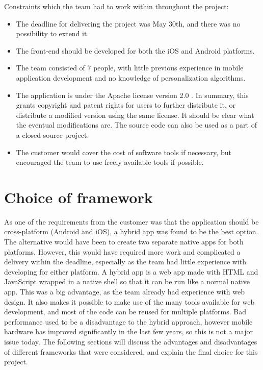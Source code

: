 Constraints which the team had to work within throughout the project:
\begin{itemize}
\item The deadline for delivering the project was May 30th, and there was no possibility to extend it.
\item The front-end should be developed for both the iOS and Android platforms.
\item The team consisted of 7 people, with little previous experience in mobile application development and no knowledge of personalization algorithms.
\item The application is under the Apache license version 2.0 \cite{HM7}. In summary, this grants copyright and patent rights for users to further distribute it, or distribute a modified version using the same license. It should be clear what the eventual modifications are. The source code can also be used as a part of a closed source project.
\item The customer would cover the cost of software tools if necessary, but encouraged the team to use freely available tools if possible.
\end{itemize}

\section{Choice of framework}

As one of the requirements from the customer was that the application should be cross-platform (Android and iOS), a hybrid app was found to be the best option. The alternative would have been to create two separate native apps for both platforms. However, this would have required more work and complicated a delivery within the deadline, especially as the team had little experience with developing for either platform. A hybrid app is a web app made with HTML and JavaScript wrapped in a native shell so that it can be run like a normal native app. This was a big advantage, as the team already had experience with web design. It also makes it possible to make use of the many tools available for web development, and most of the code can be reused for multiple platforms. Bad performance used to be a disadvantage to the hybrid approach, however mobile hardware has improved significantly in the last few years, so this is not a major issue today. The following sections will discuss the advantages and disadvantages of different frameworks that were considered, and explain the final choice for this project. \newline

